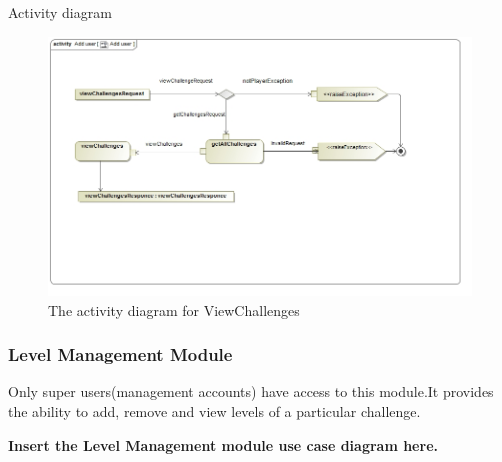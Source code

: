 \documentclass[english]{article}
\begin{document}
\begin{itemize}
\begin{figure}[H]
		 	 \end{figure}
		 	 \newpage
		 	 	\begin{center}
		 	 		Activity diagram
		 	 	\end{center}
		 	 	
		 	 	\begin{figure}[H]
		 	 		\begin{center}
		 	 			\includegraphics[scale=0.2]{ViewChallenges.jpg}
		 	 		\end{center}
		 	 		\caption{The activity diagram for ViewChallenges}
		 	 		
		 	 	\end{figure}
		 	
			
		
		\end{itemize}
		\subsubsection{Level Management Module}
		Only super users(management accounts) have access to this module.It provides the ability to add, remove and view levels of a particular challenge.
		
		\textbf{Insert the Level Management module use case diagram here.} \newline
		
\end{document}
